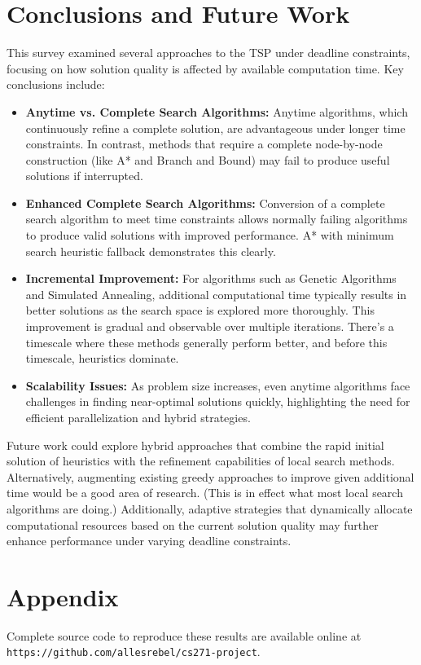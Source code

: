 \documentclass[11pt]{article}
\begin{document}
	\section{Conclusions and Future Work}
	This survey examined several approaches to the TSP under deadline constraints, focusing on how solution quality is affected by available computation time. Key conclusions include:
	\begin{itemize}[noitemsep]
		\item \textbf{Anytime vs. Complete Search Algorithms:} Anytime algorithms, which continuously refine a complete solution, are advantageous under longer time constraints. In contrast, methods that require a complete node-by-node construction (like A* and Branch and Bound) may fail to produce useful solutions if interrupted.
		\item \textbf {Enhanced Complete Search Algorithms:} Conversion of a complete search algorithm to meet time constraints allows normally failing algorithms to produce valid solutions with improved performance. A* with minimum search heuristic fallback demonstrates this clearly.
		\item \textbf{Incremental Improvement:} For algorithms such as Genetic Algorithms and Simulated Annealing, additional computational time typically results in better solutions as the search space is explored more thoroughly. This improvement is gradual and observable over multiple iterations. There's a timescale where these methods generally perform better, and before this timescale, heuristics dominate.
		\item \textbf{Scalability Issues:} As problem size increases, even anytime algorithms face challenges in finding near-optimal solutions quickly, highlighting the need for efficient parallelization and hybrid strategies.
	\end{itemize}
	
	Future work could explore hybrid approaches that combine the rapid initial solution of heuristics with the refinement capabilities of local search methods. Alternatively, augmenting existing greedy approaches to improve given additional time would be a good area of research. (This is in effect what most local search algorithms are doing.) Additionally, adaptive strategies that dynamically allocate computational resources based on the current solution quality may further enhance performance under varying deadline constraints.
	
	\section{Appendix}
	Complete source code to reproduce these results are available online at\\
	 \texttt{https://github.com/allesrebel/cs271-project}\cite{allesrebel_cs271project}.
	
	
	
	
\end{document}
